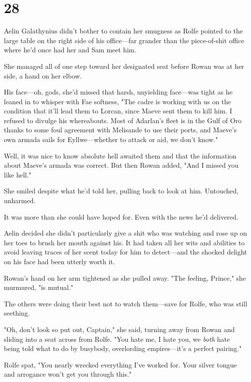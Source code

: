 
\chapter{28}

Aelin Galathynius didn't bother to contain her smugness as Rolfe pointed to the large table on the right side of his office---far grander than the piece-of-shit office where he'd once had her and Sam meet him.

She managed all of one step toward her designated seat before Rowan was at her side, a hand on her elbow.

His face---oh, gods, she'd missed that harsh, unyielding face---was tight as he leaned in to whisper with Fae softness, "The cadre is working with us on the condition that it'll lead them to Lorcan, since Maeve sent them to kill him. I refused to divulge his whereabouts. Most of Adarlan's fleet is in the Gulf of Oro thanks to some foul agreement with Melisande to use their ports, and Maeve's own armada sails for Eyllwe---whether to attack or aid, we don't know."

Well, it was nice to know absolute hell awaited them and that the information about Maeve's armada was correct. But then Rowan added, "And I missed you like hell."

She smiled despite what he'd told her, pulling back to look at him. Untouched, unharmed.

It was more than she could have hoped for. Even with the news he'd delivered.

Aelin decided she didn't particularly give a shit who was watching and rose up on her toes to brush her mouth against his. It had taken all her wits and abilities to avoid leaving traces of her scent today for him to detect---and the shocked delight on his face had been utterly worth it.

Rowan's hand on her arm tightened as she pulled away. "The feeling, Prince," she murmured, "is mutual."

The others were doing their best not to watch them---save for Rolfe, who was still seething.

"Oh, don't look so put out, Captain," she said, turning away from Rowan and sliding into a seat across from Rolfe. "You hate me, I hate you, we \emph{both} hate being told what to do by busybody, overlording empires---it's a perfect pairing."

Rolfe spat, "You nearly wrecked everything I've worked for. Your silver tongue and arrogance won't get you through this."

